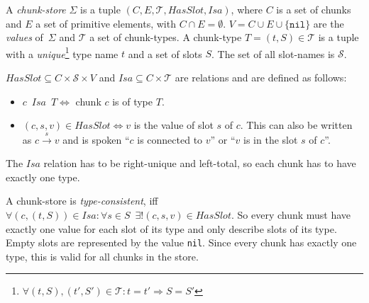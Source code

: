 \begin{definition}
A \emph{chunk-store} $\Sigma$ is a tuple $(C,E,\mathcal{T},HasSlot,Isa)$, where $C$ is a set of chunks and $E$ a set of primitive elements, with $C \cap E = \emptyset$. $V = C \cup E \cup \{ \mathtt{nil} \}$ are the \emph{values} of~$\Sigma$ and $\mathcal{T}$ a set of chunk-types. A chunk-type $T = (t,S) \in \mathcal{T}$ is a tuple with a \emph{unique}\footnote{$\forall (t,S), (t',S') \in \mathcal{T}: t = t' \Rightarrow S = S'$ } type name $t$ and a set of slots $S$. The set of all slot-names is $\mathcal{S}$. 

$HasSlot \subseteq C \times \mathcal{S} \times V$ and $Isa \subseteq C \times \mathcal{T}$ are relations and are defined as follows:

\begin{itemize}
 \item $c \enspace Isa \enspace T \Leftrightarrow$ chunk $c$ is of type $T$.
 \item $(c,s,v) \in HasSlot \Leftrightarrow v$ is the value of slot $s$ of $c$. This can also be written as $c \overset{s}{\longrightarrow} v$ and is spoken ``$c$ is connected to $v$'' or ``$v$ is in the slot $s$ of $c$''.
\end{itemize}

The $Isa$ relation has to be right-unique and left-total, so each chunk has to have exactly one type.

% 


A chunk-store is \emph{type-consistent}, iff $\forall (c,(t,S)) \in Isa: \forall s \in S \enspace \exists ! (c,s,v) \in HasSlot$. So every chunk must have exactly one value for each slot of its type and only describe slots of its type. Empty slots are represented by the value \lstinline|nil|. Since every chunk has exactly one type, this is valid for all chunks in the store.


\end{definition}


